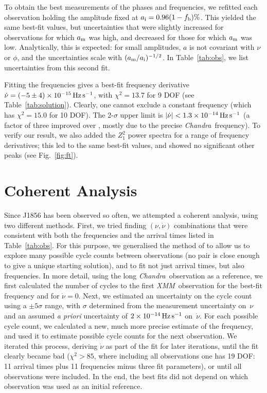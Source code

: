 \documentclass{emulateapj}\usepackage{apjfonts}
\newcommand{\cxo}{{\em Chandra}}
\newcommand{\xmm}{{\em XMM}}
\begin{document}
To obtain the best measurements of the phases and frequencies, we
refitted each observation holding the amplitude fixed at $a_{\rm
  i}=0.96(1-f_{\rm b})\%$.  This yielded the same best-fit values,
but uncertainties that were slightly increased for observations for
which $a_{\rm m}$ was high, and decreased for those for which $a_{\rm
  m}$ was low.  Analytically, this is expected: for small amplitudes,
$a$ is not covariant with $\nu$ or $\phi$, and the uncertainties scale
with $(a_{\rm m}/a_{\rm i})^{-1/2}$.  In Table~\ref{tab:obs}, we list
uncertainties from this second fit.

Fitting the frequencies gives a best-fit frequency derivative
$\dot\nu=(-5\pm4)\times10^{-15}{\rm\,Hz\,s^{-1}}$, with $\chi^2=13.7$
for 9 DOF (see Table~\ref{tab:solution}).  Clearly, one cannot exclude
a constant frequency (which has $\chi^2=15.0$ for 10 DOF).  The
2-$\sigma$ upper limit is
$|\dot\nu|<1.3\times10^{-14}{\rm\,Hz\,s^{-1}}$ (a factor of three
improved over , mostly due to the precise
\cxo\ frequency).  To verify our result, we also added the $Z_1^2$
power spectra for a range of frequency derivatives; this led to the
same best-fit values, and showed no significant other peaks (see
Fig.~\ref{fig:ft}).

\section{Coherent Analysis}
\label{sec:coherent}

Since J1856 has been observed so often, we attempted a coherent
analysis, using two different methods.  First, we tried finding
$(\nu,\dot\nu)$ combinations that were consistent with both the
frequencies and the arrival times listed in Table~\ref{tab:obs}.  For
this purpose, we generalised the method of  to allow
us to explore many possible cycle counts between observations (no pair
is close enough to give a unique starting solution), and to fit not
just arrival times, but also frequencies.  In more detail, using the
long \cxo\ observation as a reference, we first calculated the number
of cycles to the first \xmm\ observation for the best-fit frequency
and for $\dot\nu=0$.  Next, we estimated an uncertainty on the cycle
count using a $\pm5\sigma$ range, with $\sigma$ determined from the
measurement uncertainty on~$\nu$ and an assumed {\em a priori}
uncertainty of $2\times10^{-14}{\rm\,Hz\,s^{-1}}$ on~$\dot\nu$.  For
each possible cycle count, we calculated a new, much more precise
estimate of the frequency, and used it to estimate possible cycle
counts for the next observation.  We iterated this process, deriving
$\dot\nu$ as part of the fit for later iterations, until the fit
clearly became bad ($\chi^2>85$, where including all observations one
has 19 DOF: 11 arrival times plus 11 frequencies minus three fit
parameters), or until all observations were included.  In the end, the
best fits did not depend on which observation was used as an initial
reference.
\end{document}
